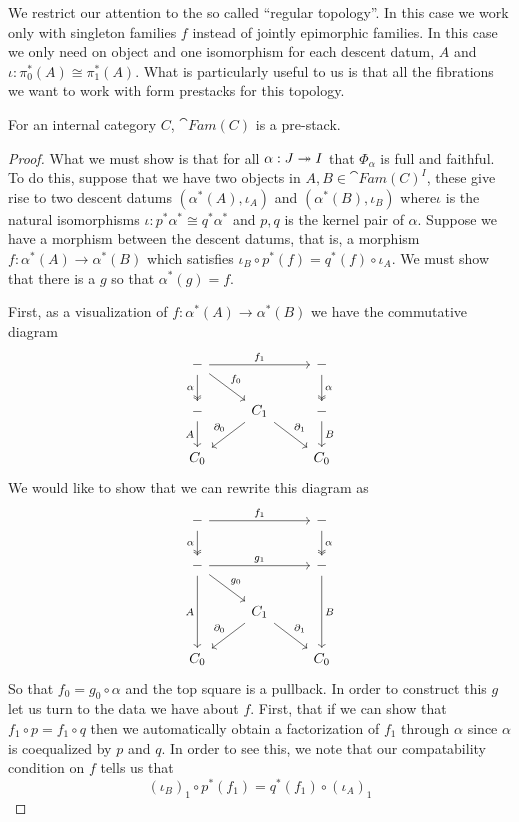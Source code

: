 We restrict our attention to the so called ``regular topology''. In
this case we work only with singleton families $f$ instead of jointly
epimorphic families. In this case we only need on object and one
isomorphism for each descent datum, $A$ and
$\iota : \pi_0^*(A) \cong \pi_1^*(A)$. What is particularly useful to
us is that all the fibrations we want to work with form prestacks for
this topology.
\begin{thm}
  For an internal category $C$, $\cat{Fam}(C)$ is a pre-stack.
\end{thm}
\begin{proof}
  What we must show is that for all $\alpha : J \twoheadrightarrow I$ that
  $\Phi_\alpha$ is full and faithful. To do this, suppose that we have
  two objects in $A, B \in \cat{Fam}(C)^I$, these give rise to two
  descent datums $(\alpha^*(A), \iota_A)$ and $(\alpha^*(B), \iota_B)$
  where$\iota$ is the natural isomorphisms
  $\iota : p^*\alpha^* \cong q^*\alpha^*$ and $p, q$ is the kernel
  pair of $\alpha$. Suppose we have a morphism between the descent
  datums, that is, a morphism $f : \alpha^*(A) \to \alpha^*(B)$ which
  satisfies $\iota_B \circ p^*(f) = q^*(f) \circ \iota_A$. We must
  show that there is a $g$ so that $\alpha^*(g) = f$.

  First, as a visualization of $f : \alpha^*(A) \to \alpha^*(B)$ we
  have the commutative diagram
  \[
    \begin{tikzcd}
      - \ar[d, swap, twoheadrightarrow, "\alpha"] \ar[rd, "f_0"] \ar[rr, "f_1"] && - \ar[d, twoheadrightarrow, "\alpha"]\\
      - \ar[d, swap, "A"] & C_1 \ar[dl, swap, "\partial_0"] \ar[dr, "\partial_1"] & - \ar[d, "B"]\\
      C_0 && C_0
    \end{tikzcd}
  \]
  We would like to show that we can rewrite this diagram as
  \[
    \begin{tikzcd}
      - \ar[d, swap, twoheadrightarrow, "\alpha"] \ar[rr, "f_1"] && - \ar[d, twoheadrightarrow, "\alpha"]\\
      - \ar[dd, swap, "A"] \ar[rr, "g_1"] \ar[dr, "g_0"]  & & - \ar[dd, "B"]\\
      & C_1 \ar[dl, swap, "\partial_0"] \ar[dr, "\partial_1"] &\\
      C_0 && C_0
    \end{tikzcd}
  \]
  So that $f_0 = g_0 \circ \alpha$ and the top square is a
  pullback. In order to construct this $g$ let us turn to the data we
  have about $f$. First, that if we can show that
  $f_1 \circ p = f_1 \circ q$ then we automatically obtain a
  factorization of $f_1$ through $\alpha$ since $\alpha$ is
  coequalized by $p$ and $q$. In order to see this, we note that our
  compatability condition on $f$ tells us that
  \[
    (\iota_B)_1 \circ p^*(f_1) = q^*(f_1) \circ (\iota_A)_1
  \]



\end{proof}
